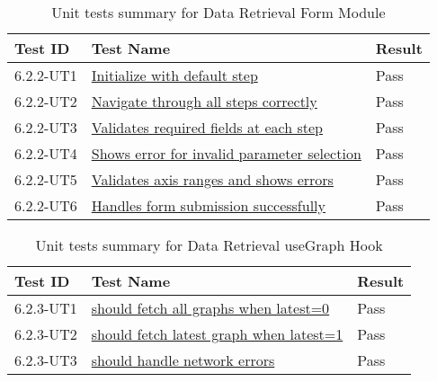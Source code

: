 \documentclass[12pt, titlepage]{article}
\begin{document}
\begin{table}[H]
  \centering
  \begin{tabular}{|l|l|l|}
    \hline
    \textbf{Test ID} & \textbf{Test Name} & \textbf{Result}\\
    \hline
    6.2.2-UT1 & \href{https://github.com/SumanyaG/Alkalytics/blob/documentation/VnV/src/frontend/test/components/modals/DataFormModel.test.tsx}{Initialize with default step} & Pass \\
    \hline
    6.2.2-UT2 & \href{https://github.com/SumanyaG/Alkalytics/blob/documentation/VnV/src/frontend/test/components/modals/DataFormModel.test.tsx}{Navigate through all steps correctly} & Pass \\
    \hline
    6.2.2-UT3 & \href{https://github.com/SumanyaG/Alkalytics/blob/documentation/VnV/src/frontend/test/components/modals/DataFormModel.test.tsx}{Validates required fields at each step} & Pass \\
    \hline
    6.2.2-UT4 & \href{https://github.com/SumanyaG/Alkalytics/blob/documentation/VnV/src/frontend/test/components/modals/DataFormModel.test.tsx}{Shows error for invalid parameter selection} & Pass \\
    \hline
    6.2.2-UT5 & \href{https://github.com/SumanyaG/Alkalytics/blob/documentation/VnV/src/frontend/test/components/modals/DataFormModel.test.tsx}{Validates axis ranges and shows errors} & Pass \\
    \hline
    6.2.2-UT6 & \href{https://github.com/SumanyaG/Alkalytics/blob/documentation/VnV/src/frontend/test/components/modals/DataFormModel.test.tsx}{Handles form submission successfully} & Pass \\
    \hline
  \end{tabular}
  \caption{Unit tests summary for Data Retrieval Form Module}
  \label{UT:DataRetrieval2}
\end{table}


\begin{table}[H]
  \centering
  \begin{tabular}{|l|l|l|}
    \hline
    \textbf{Test ID} & \textbf{Test Name} & \textbf{Result}\\
    \hline
    6.2.3-UT1 & \href{https://github.com/SumanyaG/Alkalytics/blob/main/src/frontend/test/hooks/useGraph.test.tsx}{should fetch all graphs when latest=0} & Pass \\
    \hline
    6.2.3-UT2 & \href{https://github.com/SumanyaG/Alkalytics/blob/main/src/frontend/test/hooks/useGraph.test.tsx}{should fetch latest graph when latest=1} & Pass \\
    \hline
    6.2.3-UT3 & \href{https://github.com/SumanyaG/Alkalytics/blob/main/src/frontend/test/hooks/useGraph.test.tsx}{should handle network errors} & Pass \\
    \hline
  \end{tabular}
  \caption{Unit tests summary for Data Retrieval useGraph Hook}
  \label{UT:DataRetrieval3}
\end{table}
\end{document}
